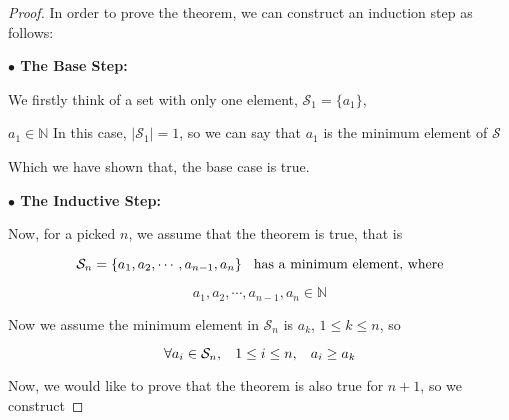\documentclass[12pt]{article}
\begin{document}
\begin{proof}

    In order to prove the theorem, we can construct an induction step as follows:
    
    \vspace*{0.3cm}
    \hspace*{1.2cm}
    \textbf{$\bullet$ The Base Step:}

    \vspace*{0.3cm}
    \hspace*{1.2cm}
    We firstly think of a set with only one element, $\mathcal{S}_1 = \lbrace{ a_1 \rbrace } $,
    
    \vspace*{0.3cm}
    \hspace*{1.2cm}
    $a_1 \in \mathbb{N} $
    In this case, $ \lvert \mathcal{S}_1 \rvert =1 $, so we can say that $a_1$ is the minimum element
    of $\mathcal{S}$
    
    \vspace*{0.3cm}
    \hspace*{1.2cm}
    Which we have shown that, the base case is true.

    \vspace*{0.3cm}
    \hspace*{1.2cm}
    \textbf{$\bullet$ The Inductive Step:}

    \vspace*{0.3cm}
    \hspace*{1.2cm}
    Now, for a picked $n$, we assume that the theorem is true, that is

    \[ \mathcal{S}_n = \lbrace a_1, a_2, \cdots, a_{n-1}, a_n \rbrace \hspace*{0.3cm} \text{has a minimum element, where}\]

    \[ a_1, a_2, \cdots, a_{n-1}, a_n \in \mathbb{N} \]

    \vspace*{0.3cm}
    \hspace*{1.2cm}
    Now we assume the minimum element in $\mathcal{S}_n$ is $a_k$, $1 \leq k \leq n$, so

    \[ \forall a_i \in \mathcal{S}_n, \hspace*{0.3cm} 1 \leq i \leq n, \hspace*{0.3cm} a_i \geq a_k \]

    \vspace*{0.3cm}
    \hspace*{1.2cm}
    Now, we would like to prove that the theorem is also true for $n+1$, so we construct 
    

\end{proof}
\end{document}
